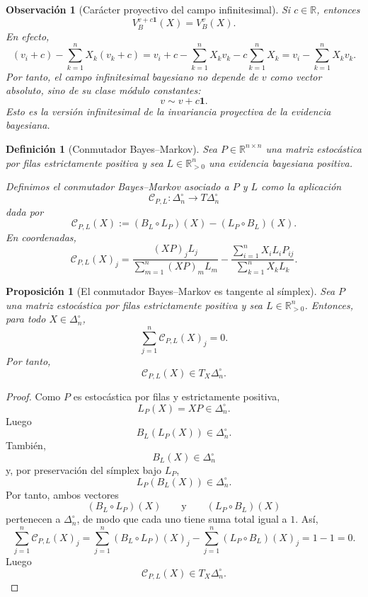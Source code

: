 \documentclass[12pt]{article}
\newtheorem{definicion}{Definición}[section]
\newtheorem{proposicion}{Proposición}[section]
\newtheorem{observacion}{Observación}[section]
\begin{document}
\begin{observacion}[Carácter proyectivo del campo infinitesimal]
Si \(c\in\mathbb{R}\), entonces
\[
V_B^{v+c\mathbf{1}}(X)=V_B^v(X).
\]
En efecto,
\[
(v_i+c)-\sum_{k=1}^{n}X_k(v_k+c)
=
v_i+c-\sum_{k=1}^{n}X_kv_k-c\sum_{k=1}^{n}X_k
=
v_i-\sum_{k=1}^{n}X_kv_k.
\]
Por tanto, el campo infinitesimal bayesiano no depende de \(v\) como vector absoluto,
sino de su clase módulo constantes:
\[
v\sim v+c\mathbf{1}.
\]
Esto es la versión infinitesimal de la invariancia proyectiva de la evidencia bayesiana.
\end{observacion}

\begin{definicion}[Conmutador Bayes--Markov]
Sea \(P\in\mathbb{R}^{n\times n}\) una matriz estocástica por filas estrictamente positiva
y sea \(L\in\mathbb{R}_{>0}^{n}\) una evidencia bayesiana positiva.

Definimos el \emph{conmutador Bayes--Markov} asociado a \(P\) y \(L\) como la aplicación
\[
\mathcal{C}_{P,L}:\Delta_n^\circ\longrightarrow T\Delta_n^\circ
\]
dada por
\[
\mathcal{C}_{P,L}(X)
:=
(B_L\circ L_P)(X)
-
(L_P\circ B_L)(X).
\]
En coordenadas,
\[
\mathcal{C}_{P,L}(X)_j
=
\frac{(XP)_jL_j}{\sum_{m=1}^{n}(XP)_mL_m}
-
\frac{\sum_{i=1}^{n}X_iL_iP_{ij}}{\sum_{k=1}^{n}X_kL_k}.
\]
\end{definicion}

\begin{proposicion}[El conmutador Bayes--Markov es tangente al símplex]
Sea \(P\) una matriz estocástica por filas estrictamente positiva y sea
\(L\in\mathbb{R}_{>0}^{n}\). Entonces, para todo \(X\in\Delta_n^\circ\),
\[
\sum_{j=1}^{n}\mathcal{C}_{P,L}(X)_j=0.
\]
Por tanto,
\[
\mathcal{C}_{P,L}(X)\in T_X\Delta_n^\circ.
\]
\end{proposicion}

\begin{proof}
Como \(P\) es estocástica por filas y estrictamente positiva,
\[
L_P(X)=XP\in\Delta_n^\circ.
\]
Luego
\[
B_L(L_P(X))\in\Delta_n^\circ.
\]
También,
\[
B_L(X)\in\Delta_n^\circ
\]
y, por preservación del símplex bajo \(L_P\),
\[
L_P(B_L(X))\in\Delta_n^\circ.
\]
Por tanto, ambos vectores
\[
(B_L\circ L_P)(X)
\qquad\text{y}\qquad
(L_P\circ B_L)(X)
\]
pertenecen a \(\Delta_n^\circ\), de modo que cada uno tiene suma total igual a \(1\).
Así,
\[
\sum_{j=1}^{n}\mathcal{C}_{P,L}(X)_j
=
\sum_{j=1}^{n}(B_L\circ L_P)(X)_j
-
\sum_{j=1}^{n}(L_P\circ B_L)(X)_j
=
1-1
=
0.
\]
Luego
\[
\mathcal{C}_{P,L}(X)\in T_X\Delta_n^\circ.
\]
\end{proof}
\end{document}

